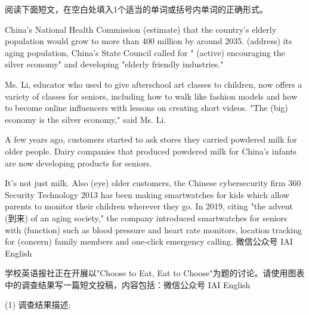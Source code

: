 \documentclass{英语试卷}
\begin{document}
\par 阅读下面短文，在空白处填入1个适当的单词或括号内单词的正确形式。\par
\par China's National Health Commission  (estimate) that the country's elderly population would grow to more than 400 million by around 2035.  (address) its aging population, China's State Council called for " (active) encouraging the silver economy" and developing "elderly friendly industries."\par
\par Ms. Li,  educator who used to give afterschool art classes to children, now offers a variety of classes for seniors, including how to walk like fashion models and how to become online influencers with lessons on creating short videos. "The  (big) economy is the silver economy," said Ms. Li.\par
\par A few years ago, customers started to ask stores  they carried powdered milk for older people. Dairy companies that produced powdered milk for China's infants are now developing products for seniors.\par
\par It's not just milk. Also  (eye) older customers, the Chinese cybersecurity firm 360 Security Technology  2013 has been making smartwatches for kids which allow parents to monitor their children wherever they go. In 2019, citing "the advent (到来) of an aging society," the company introduced smartwatches for seniors with  (function) such as blood pressure and heart rate monitors, location tracking for  (concern) family members and one-click emergency calling. 微信公众号 IAI English\par
{}
\par 学校英语报社正在开展以"Choose to Eat, Eat to Choose"为题的讨论。请使用图表中的调查结果写一篇短文投稿，内容包括：微信公众号 IAI English\par
\par (1) 调查结果描述;\par
\end{document}
